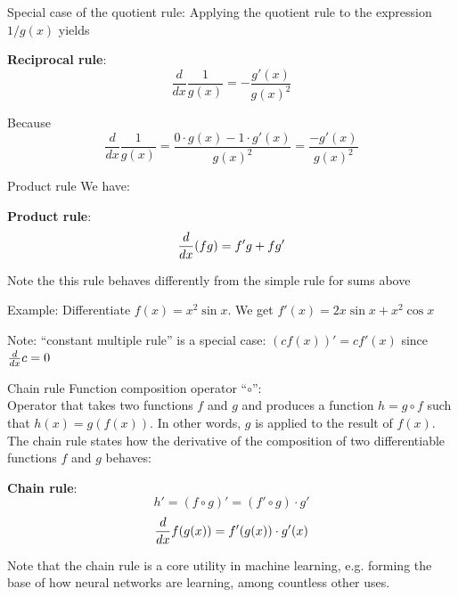\begin{frame}
    Special case of the quotient rule: Applying the quotient rule to the
    expression $1 / g(x)$ yields
    \begin{boxed}
        \textbf{Reciprocal rule}:
        $$\frac{d}{dx}\frac{1}{g(x)}=-\frac{g'(x)}{g(x)^2}$$
    \end{boxed}

    Because
    $$\frac{d}{dx}\frac{1}{g(x)}=\frac{0 \cdot g(x) - 1 \cdot g'(x)}{g(x)^2}=\frac{-g'(x)}{g(x)^2}$$
\end{frame}

\begin{frame}{Product rule}
    We have:
    \begin{boxed}
        \textbf{Product rule}:
        $${d\over dx}(fg)=f'g+fg'$$
    \end{boxed}
    Note the this rule behaves differently from the simple rule for sums above

    Example: Differentiate $f(x) = x^2 \sin x$. We get $f'(x) = 2 x \sin x + x^2 \cos x$

    Note: ``constant multiple rule'' is a special case: $(c f(x))' = c f'(x)$ since ${d \over dx} c = 0$
\end{frame}


\begin{frame}{Chain rule}
    Function composition operator ``$\circ$'':\\
    Operator that takes two functions $f$ and $g$ and produces a function $h = g \circ f$
    such that $h(x) = g(f(x))$. In other words, $g$ is applied to the result of $f(x)$.\\[5mm]

    The chain rule states how the derivative of the composition of two
    differentiable functions $f$ and $g$ behaves:
    \begin{boxed}
        \textbf{Chain rule}:
        $$h'=(f\circ g)'=(f'\circ g)\cdot g'$$
        $${d\over dx} f(g(x))=f'(g(x))\cdot g'(x)$$
    \end{boxed}

    Note that the chain rule is a core utility in machine learning, e.g. forming the base of
    how neural networks are learning, among countless other uses.
\end{frame}

